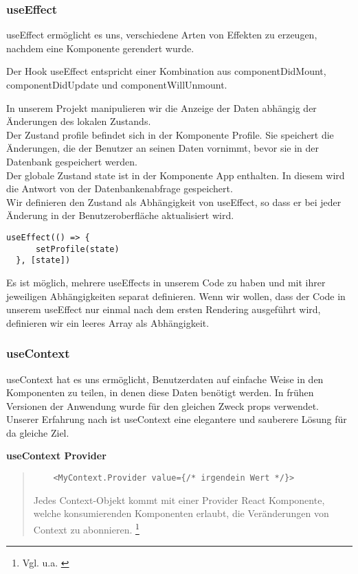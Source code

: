 \subsubsection{useEffect}
useEffect ermöglicht es uns, verschiedene Arten von Effekten zu erzeugen, nachdem eine Komponente gerendert wurde. 

Der Hook useEffect entspricht einer Kombination aus componentDidMount, componentDidUpdate und componentWillUnmount.

In unserem Projekt manipulieren wir die Anzeige der Daten abhängig der Änderungen des lokalen Zustands.\\
Der Zustand profile befindet sich in der Komponente Profile.
Sie speichert die Änderungen, die der Benutzer an seinen Daten vornimmt, bevor sie in der Datenbank gespeichert werden.
\\
Der globale Zustand state ist in der Komponente App enthalten.
In diesem wird die Antwort von der Datenbankenabfrage gespeichert.
\\
Wir definieren den Zustand als Abhängigkeit von useEffect, so dass er bei jeder Änderung in der Benutzeroberfläche aktualisiert wird.
\\
\begin{lstlisting}
useEffect(() => { 
      setProfile(state)      
  }, [state])           
\end{lstlisting}

Es ist möglich, mehrere useEffects in unserem Code zu haben und mit ihrer jeweiligen Abhängigkeiten separat definieren.
Wenn wir wollen, dass der Code in unserem useEffect nur einmal nach dem ersten Rendering ausgeführt wird, definieren wir ein leeres Array als Abhängigkeit.
\newpage

\subsubsection{useContext}
useContext hat es uns ermöglicht, Benutzerdaten auf einfache Weise in den Komponenten zu teilen, in denen diese Daten benötigt werden. In frühen Versionen der Anwendung wurde für den gleichen Zweck props verwendet.
Unserer Erfahrung nach ist useContext eine elegantere und sauberere Lösung für da gleiche Ziel.

\textbf{useContext Provider} \\

\begin{quote}
    \begin{lstlisting}
    <MyContext.Provider value={/* irgendein Wert */}>
    \end{lstlisting}

    Jedes Context-Objekt kommt mit einer Provider React Komponente, welche konsumierenden Komponenten erlaubt, die Veränderungen von Context zu abonnieren.
    \footnote{Vgl. u.a. \cite{R02}}
    \end{quote}

